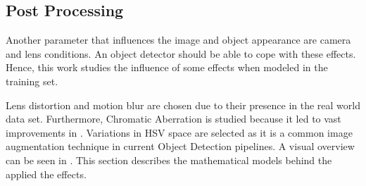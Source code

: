 \subsection{Post Processing}
\label{sec:postprocessing}
Another parameter that influences the image and object appearance are camera and lens conditions. An object detector should be able to cope with these effects. Hence, this work studies the influence of some effects when modeled in the training set.

Lens distortion and motion blur are chosen due to their presence in the real world data set. Furthermore, Chromatic Aberration is studied because it led to vast improvements in \cite{Carlson2018}. Variations in \ac{HSV} space are selected as it is a common image augmentation technique in current Object Detection pipelines. A visual overview can be seen in . This section describes the mathematical models behind the applied the effects.

